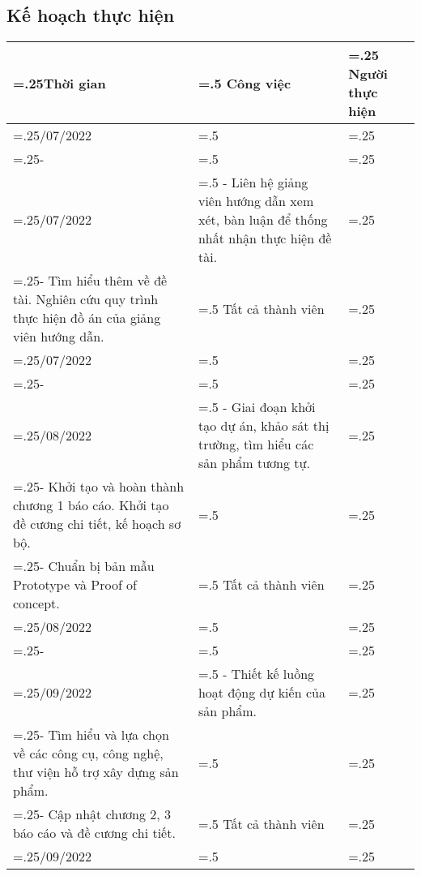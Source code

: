 \subsection{Kế hoạch thực hiện}
\begin{tabularx}{\textwidth}{|>{\hsize=.25\hsize\centering\let\newline
    \\\arraybackslash}X|>{\hsize=.5\hsize\centering\let\newline
    \\\arraybackslash}X|>{\hsize=.25\hsize\centering\let\newline
    \\\arraybackslash}X|}
    \hline
    \textbf{Thời gian}
     & \textbf{Công việc}
     & \textbf{Người thực hiện}
    \\
    \hline
    01/07/2022
    \newline
    -
    \newline
    15/07/2022
     & - Liên hệ giảng viên hướng dẫn xem xét, bàn luận để thống nhất nhận thực hiện đề tài.
    \newline
    - Tìm hiểu thêm về đề tài. Nghiên cứu quy trình thực hiện đồ án của giảng viên hướng dẫn.
     & Tất cả thành viên
    \\
    \hline
    15/07/2022
    \newline
    -
    \newline
    15/08/2022
     & - Giai đoạn khởi tạo dự án, khảo sát thị trường, tìm hiểu các sản phẩm tương tự.
    \newline
    - Khởi tạo và hoàn thành chương 1 báo cáo. Khởi tạo đề cương chi tiết, kế hoạch sơ bộ.
    \newline
    - Chuẩn bị bản mẫu Prototype và Proof of concept.
     & Tất cả thành viên
    \\
    \hline
    15/08/2022
    \newline
    -
    \newline
    15/09/2022
     & - Thiết kế luồng hoạt động dự kiến của sản phẩm.
    \newline
    - Tìm hiểu và lựa chọn về các công cụ, công nghệ, thư viện hỗ trợ xây dựng sản phẩm.
    \newline
    - Cập nhật chương 2, 3 báo cáo và đề cương chi tiết.
     & Tất cả thành viên
    \\
    \hline
    15/09/2022
    \newline

\end{tabularx}
